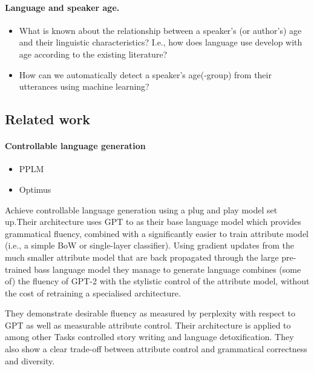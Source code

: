 
\paragraph{Language and speaker age.}

\begin{itemize}
    \item What is known about the relationship between a speaker's (or author's) age and their linguistic characteristics? I.e., how does language use develop with age according to the existing literature?
    \item How can we automatically detect a speaker's age(-group) from their utterances using machine learning?
\end{itemize}

\subsection{Related work}

\paragraph{Controllable language generation}
\begin{itemize}
    \item PPLM \cite{dathathri2019plug}
    \item Optimus \citep{li-etal-2020-optimus}
\end{itemize}

\cite{dathathri2019plug} Achieve controllable language generation using a plug and play model set up.Their architecture uses GPT to as their base language model which provides grammatical fluency, combined with a significantly easier to train attribute model (i.e., a simple BoW or single-layer classifier). Using gradient updates from the much smaller attribute model that are back propagated through the large pre-trained bass language model they manage to generate language combines (some of) the fluency of GPT-2 with the stylistic control of the attribute model, without the cost of retraining a specialised architecture.

They demonstrate desirable fluency as measured by perplexity with respect to GPT as well as measurable attribute control. Their architecture is applied to among other Tasks controlled story writing and language detoxification. They also show a clear trade-off between attribute control and grammatical correctness and diversity.

